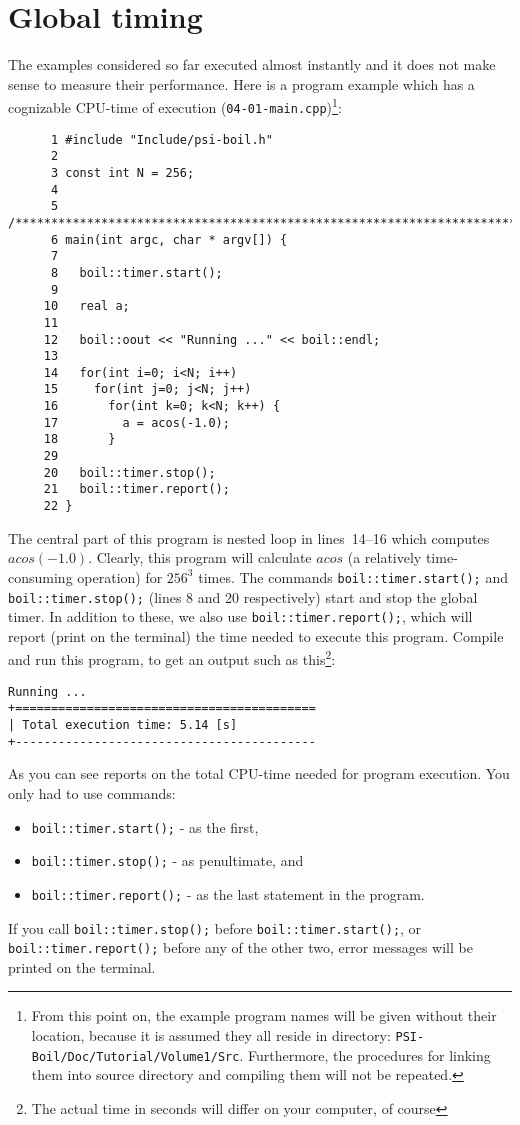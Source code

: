 \section{Global timing}
\label{sec_global}

The examples considered so far executed almost instantly and it does not
make sense to measure their performance. Here is a program example
which has a cognizable CPU-time of execution ({\tt 04-01-main.cpp})\footnote{From
this point on, the example program names will be given without their location,
because it is assumed they all reside in directory: {\tt PSI-Boil/Doc/Tutorial/Volume1/Src}.
Furthermore, the procedures for linking them into source directory and compiling
them will not be repeated.}:
%
{\small \begin{verbatim}
      1 #include "Include/psi-boil.h"
      2
      3 const int N = 256;
      4
      5 /****************************************************************************/
      6 main(int argc, char * argv[]) {
      7
      8   boil::timer.start();
      9
     10   real a;
     11
     12   boil::oout << "Running ..." << boil::endl;
     13
     14   for(int i=0; i<N; i++)
     15     for(int j=0; j<N; j++)
     16       for(int k=0; k<N; k++) {
     17         a = acos(-1.0);
     18       }
     29
     20   boil::timer.stop();
     21   boil::timer.report();
     22 }
\end{verbatim}}
%
The central part of this program is nested loop in lines~14--16 which computes
$acos(-1.0)$. Clearly, this program will calculate $acos$ (a relatively 
time-consuming operation) for $256^3$ times. The commands {\tt boil::timer.start();}
and {\tt boil::timer.stop();} (lines 8 and 20 respectively) start and stop the 
global timer. In addition to these, we also use {\tt boil::timer.report();}, which
will report (print on the terminal) the time needed to execute this program. 
Compile and run this program, to get an output such as this\footnote{The actual 
time in seconds will differ on your computer, of course}: 
%
{\small \begin{verbatim}
Running ...
+==========================================
| Total execution time: 5.14 [s]
+------------------------------------------
\end{verbatim}}
%
As you can see {\psiboil} reports on the total CPU-time needed for program 
execution. You only had to use commands:
%
\begin{itemize}
  \item {\tt boil::timer.start();} - as the first,
  \item {\tt boil::timer.stop();} - as penultimate, and
  \item {\tt boil::timer.report();} - as the last statement in the program.
\end{itemize}
%
If you call {\tt boil::timer.stop();} before {\tt boil::timer.start();}, or
{\tt boil::timer.report();} before any of the other two, error messages will
be printed on the terminal.

